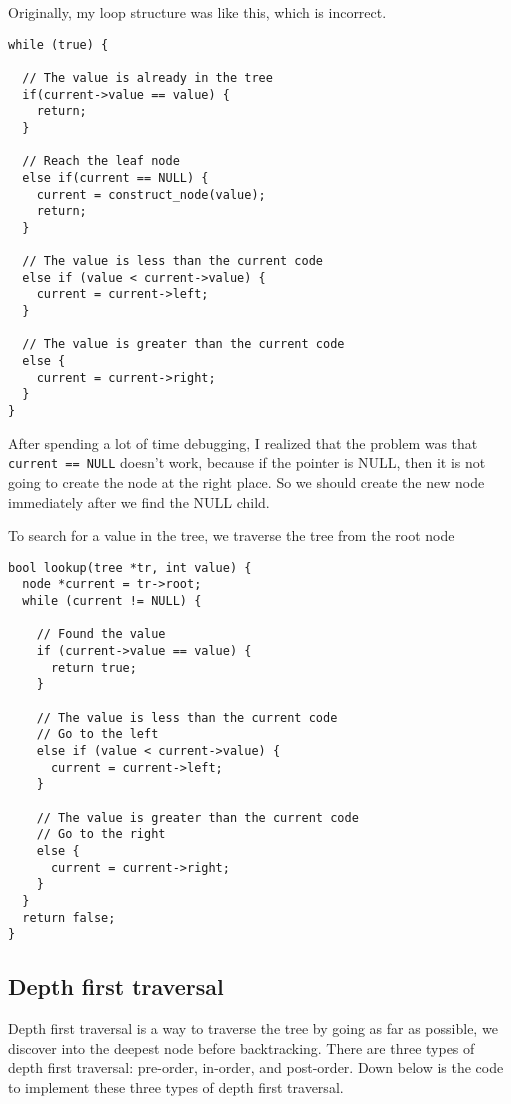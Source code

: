 \documentclass[a4paper,11pt]{article}
\begin{document}
Originally, my loop structure was like this, which is incorrect.

\begin{verbatim}
while (true) {

  // The value is already in the tree
  if(current->value == value) {
    return;
  }

  // Reach the leaf node
  else if(current == NULL) {
    current = construct_node(value);
    return;
  }

  // The value is less than the current code
  else if (value < current->value) {
    current = current->left;
  }

  // The value is greater than the current code
  else {
    current = current->right;
  }
}
\end{verbatim}

After spending a lot of time debugging, I realized that the problem was
that \texttt{current == NULL} doesn't work, because if the pointer is NULL,
then it is not going to create the node at the right place. So we should create
the new node immediately after we find the NULL child. 

To search for a value in the tree, we traverse the tree from the root node

\begin{verbatim}
bool lookup(tree *tr, int value) {
  node *current = tr->root;
  while (current != NULL) {

    // Found the value
    if (current->value == value) {
      return true;
    } 
    
    // The value is less than the current code
    // Go to the left
    else if (value < current->value) {
      current = current->left;
    } 
    
    // The value is greater than the current code
    // Go to the right
    else {
      current = current->right;
    }
  }
  return false;
}
\end{verbatim}

\subsection*{Depth first traversal}

Depth first traversal is a way to traverse the tree by going as far as possible, 
we discover into the deepest node before backtracking. There are three types of
depth first traversal: pre-order, in-order, and post-order. Down below is the code
to implement these three types of depth first traversal.
\end{document}
